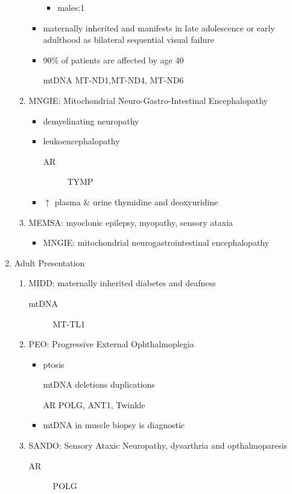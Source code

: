 \documentclass{scrartcl}
\begin{document}
\begin{enumerate}
\begin{enumerate}
\begin{itemize}
\begin{itemize}
\item males:1
\end{itemize}
\item maternally inherited and manifests in late adolescence or early
adulthood as bilateral sequential visual failure
\item 90\% of patients are affected by age 40
\item[{mtDNA}] MT-ND1,MT-ND4, MT-ND6
\end{itemize}
\item MNGIE: Mitochondrial Neuro-Gastro-Intestinal Encephalopathy
\label{sec:org89a29b5}
\begin{itemize}
\item demyelinating neuropathy
\item leukoencephalopathy
\begin{description}
\item[{AR}] TYMP
\end{description}
\item \(\uparrow\) plasma \& urine thymidine and deoxyuridine
\end{itemize}
\item MEMSA: myoclonic epilepsy, myopathy, sensory ataxia
\label{sec:orgc4c2482}
\begin{itemize}
\item MNGIE: mitochondrial neurogastrointestinal encephalopathy
\end{itemize}
\end{enumerate}

\item Adult Presentation
\label{sec:orgf68a47f}
\begin{enumerate}
\item MIDD: maternally inherited diabetes and deafness
\label{sec:org0dbf581}
\begin{description}
\item[{mtDNA}] MT-TL1
\end{description}
\item PEO: Progressive External Ophthalmoplegia
\label{sec:org51f8903}
\begin{itemize}
\item ptosis
\item[{mtDNA}] deletions \textpm{} duplications
\item[{AR}] POLG, ANT1, Twinkle
\item mtDNA in muscle biopsy is diagnostic
\end{itemize}
\item SANDO: Sensory Ataxic Neuropathy, dysarthria and opthalmoparesis
\label{sec:orgc6340b0}
\begin{description}
\item[{AR}] POLG
\end{description}
\end{enumerate}
\end{enumerate}
\end{document}
